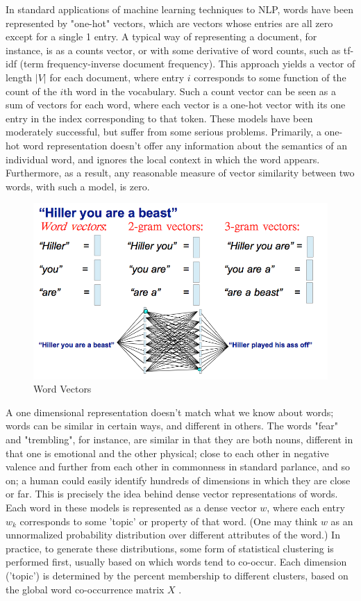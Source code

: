 \documentclass[conference]{IEEEtran}
\begin{document}
\indent In standard applications of machine learning techniques to NLP, words have been represented by "one-hot" vectors, which are vectors whose entries are all zero except for a single 1 entry. A typical way of representing a document, for instance, is as a counts vector, or with some derivative of word counts, such as tf-idf (term frequency-inverse document frequency).  This approach yields a vector of length $|V|$ for each document, where entry $i$ corresponds to some function of the count of the $i$th word in the vocabulary.  Such a count vector can be seen as a sum of vectors for each word, where each vector is a one-hot vector with its one entry in the index corresponding to that token.  These models have been moderately successful, but suffer from some serious problems. Primarily, a one-hot word representation  doesn't offer any information about the semantics of an individual word, and ignores the local context in which the word appears. Furthermore, as a result, any reasonable measure of vector similarity between two words, with such a model, is zero.\\

\begin{figure}
	\centering
	\includegraphics[scale=0.3]{tweet_cmp_cs221.png}
	\caption{Word Vectors}
	\label{fig1}
\end{figure}

\indent A one dimensional representation doesn't match what we know about words; words can be similar in certain ways, and different in others.  The words "fear" and "trembling", for instance, are similar in that they are both nouns, different in that one is emotional and the other physical; close to each other in negative valence and further from each other in commonness in standard parlance, and so on; a human could easily identify hundreds of dimensions in which they are close or far.  This is precisely the idea behind dense vector representations of words. Each word in these models is represented as a dense vector $w$, where each entry $w_k$ corresponds to some 'topic' or property of that word. (One may think $w$ as an unnormalized probability distribution over different attributes of the word.) In practice, to generate these distributions, some form of statistical clustering is performed first, usually based on which words tend to co-occur. Each dimension ('topic') is determined by the percent membership to different clusters, based on the global word co-occurrence matrix $X$ \cite{Wordvec}.\\
\end{document}
